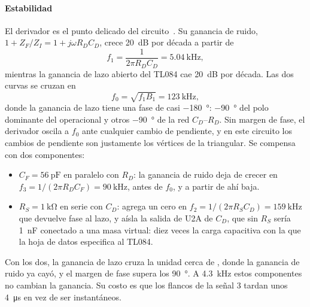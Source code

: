 \paragraph*{Estabilidad} El derivador es el punto delicado del circuito~\cite{franco}. Su ganancia de ruido, $1 + Z_F/Z_I = 1 + j\omega R_D C_D$, crece \SI{20}{\deci\bel} por década a partir de
\begin{equation}
f_1 = \frac{1}{2\pi R_D C_D} = \SI{5,04}{\kilo\hertz},
\end{equation}
mientras la ganancia de lazo abierto del TL084 cae \SI{20}{\deci\bel} por década. Las dos curvas se cruzan en
\begin{equation}
f_0 = \sqrt{f_1 B_1} = \SI{123}{\kilo\hertz},
\end{equation}
donde la ganancia de lazo tiene una fase de casi \SI{-180}{\degree}: \SI{-90}{\degree} del polo dominante del operacional y otros \SI{-90}{\degree} de la red $C_D$--$R_D$. Sin margen de fase, el derivador oscila a $f_0$ ante cualquier cambio de pendiente, y en este circuito los cambios de pendiente son justamente los vértices de la triangular. Se compensa con dos componentes:
\begin{itemize}[leftmargin=*, nosep]
    \item $C_F = \SI{56}{\pico\farad}$ en paralelo con $R_D$: la ganancia de ruido deja de crecer en $f_3 = 1/(2\pi R_D C_F) = \SI{90}{\kilo\hertz}$, antes de $f_0$, y a partir de ahí baja.
    \item $R_S = \SI{1}{\kilo\ohm}$ en serie con $C_D$: agrega un cero en $f_2 = 1/(2\pi R_S C_D) = \SI{159}{\kilo\hertz}$ que devuelve fase al lazo, y aísla la salida de U2A de $C_D$, que sin $R_S$ sería \SI{1}{\nano\farad} conectado a una masa virtual: diez veces la carga capacitiva con la que la hoja de datos especifica al TL084.
\end{itemize}
Con los dos, la ganancia de lazo cruza la unidad cerca de , donde la ganancia de ruido ya cayó, y el margen de fase supera los \SI{90}{\degree}. A \SI{4,3}{\kilo\hertz} estos componentes no cambian la ganancia. Su costo es que los flancos de la señal 3 tardan unos \SI{4}{\micro\second} en vez de ser instantáneos.


